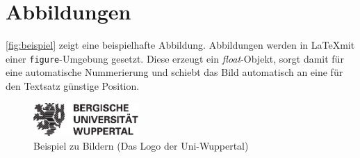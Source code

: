 	\section{Abbildungen}
		\autoref{fig:beispiel} zeigt eine beispielhafte Abbildung.
		Abbildungen werden in \LaTeX mit einer \lstinline[language=thesis-latexbeispiel]|figure|-Umgebung gesetzt.
		Diese erzeugt ein \emph{float}-Objekt, sorgt damit für eine automatische Nummerierung und schiebt das Bild automatisch an eine für den Textsatz günstige Position.%
		\begin{figure}[!h]
			\centering
			\includegraphics[width=4cm]{Medien/Uni_Wuppertal_Logo}
			\caption[Beispiel zu Bildern]{Beispiel zu Bildern (Das Logo der Uni-Wuppertal)}
			\label{fig:beispiel}
		\end{figure}

